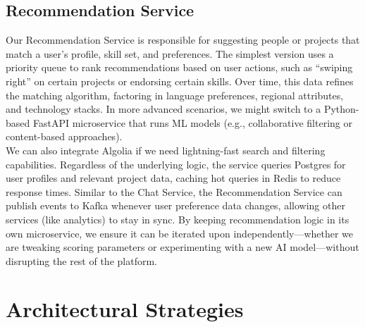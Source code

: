 \documentclass{FastFyp}
\begin{document}
\subsection{Recommendation Service}
Our Recommendation Service is responsible for suggesting people or projects that match a user’s profile, skill set, and preferences. The simplest version uses a priority queue to rank recommendations based on user actions, such as “swiping right” on certain projects or endorsing certain skills. Over time, this data refines the matching algorithm, factoring in language preferences, regional attributes, and technology stacks. In more advanced scenarios, we might switch to a Python-based FastAPI microservice that runs ML models (e.g., collaborative filtering or content-based approaches). \\
We can also integrate Algolia if we need lightning-fast search and filtering capabilities. Regardless of the underlying logic, the service queries Postgres for user profiles and relevant project data, caching hot queries in Redis to reduce response times. Similar to the Chat Service, the Recommendation Service can publish events to Kafka whenever user preference data changes, allowing other services (like analytics) to stay in sync. By keeping recommendation logic in its own microservice, we ensure it can be iterated upon independently—whether we are tweaking scoring parameters or experimenting with a new AI model—without disrupting the rest of the platform.

\section{Architectural Strategies}
\end{document}
